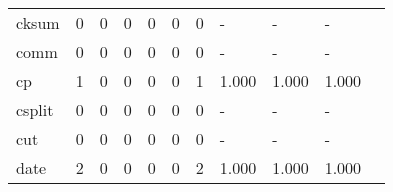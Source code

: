 \begin{longtable}{lp{1.2cm}p{1.2cm}p{1.2cm}p{1.2cm}p{1.2cm}p{1.2cm}p{1.2cm}p{1.2cm}p{1.2cm}p{1.2cm}}
cksum     &                                     0 &                                                  0 &                                                  0 &                                                  0 &                                                  0 &                                                  0 &                                             - &                                                  - &                                                  - \\
comm      &                                     0 &                                                  0 &                                                  0 &                                                  0 &                                                  0 &                                                  0 &                                             - &                                                  - &                                                  - \\
cp        &                                     1 &                                                  0 &                                                  0 &                                                  0 &                                                  0 &                                                  1 &                                         1.000 &                                              1.000 &                                              1.000 \\
csplit    &                                     0 &                                                  0 &                                                  0 &                                                  0 &                                                  0 &                                                  0 &                                             - &                                                  - &                                                  - \\
cut       &                                     0 &                                                  0 &                                                  0 &                                                  0 &                                                  0 &                                                  0 &                                             - &                                                  - &                                                  - \\
date      &                                     2 &                                                  0 &                                                  0 &                                                  0 &                                                  0 &                                                  2 &                                         1.000 &                                              1.000 &                                              1.000 \\

\end{longtable}
